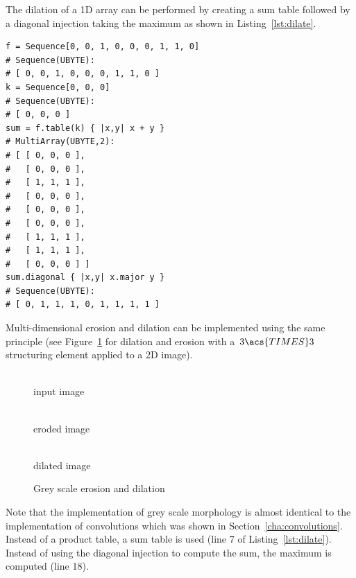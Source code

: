 \documentclass[12pt,a4paper,oneside,openright]{book}
\newcommand{\sct}[1]{Section~\ref{cha:#1}}
\newcommand{\fig}[1]{Figure~\ref{fig:#1}}
\newcommand{\lst}[1]{Listing~\ref{lst:#1}}
\begin{document}
\begin{CJK}{UTF8}{}
The dilation of a \ac{1D} array can be performed by creating a sum table followed by a diagonal injection taking the maximum as shown in \lst{dilate}.
\lstset{language=Ruby,frame=single,numbers=left}
\begin{lstlisting}[float,caption={Implementing dilation using diagonal injection},escapechar=\$,label=lst:dilate]
f = Sequence[0, 0, 1, 0, 0, 0, 1, 1, 0]
# Sequence(UBYTE):
# [ 0, 0, 1, 0, 0, 0, 1, 1, 0 ]
k = Sequence[0, 0, 0]
# Sequence(UBYTE):
# [ 0, 0, 0 ]
sum = f.table(k) { |x,y| x + y }
# MultiArray(UBYTE,2):
# [ [ 0, 0, 0 ],
#   [ 0, 0, 0 ],
#   [ 1, 1, 1 ],
#   [ 0, 0, 0 ],
#   [ 0, 0, 0 ],
#   [ 0, 0, 0 ],
#   [ 1, 1, 1 ],
#   [ 1, 1, 1 ],
#   [ 0, 0, 0 ] ]
sum.diagonal { |x,y| x.major y }
# Sequence(UBYTE):
# [ 0, 1, 1, 1, 0, 1, 1, 1, 1 ]
\end{lstlisting}
Multi-dimensional erosion and dilation can be implemented using the same principle (see \fig{morph} for dilation and erosion with a $3\acs{TIMES} 3$ structuring element applied to a \ac{2D} image).
\begin{figure}[htbp]
  \begin{center}
    \begin{minipage}[t]{.3\textwidth}
      \begin{center}
        \\
        input image
      \end{center}
    \end{minipage}
    \begin{minipage}[t]{.3\textwidth}
      \begin{center}
        \\
        eroded image
      \end{center}
    \end{minipage}
    \begin{minipage}[t]{.3\textwidth}
      \begin{center}
        \\
        dilated image
      \end{center}
    \end{minipage}
    \caption{Grey scale erosion and dilation\label{fig:morph}}
  \end{center}
\end{figure}
Note that the implementation of grey scale morphology is almost identical to the implementation of convolutions which was shown in \sct{convolutions}. Instead of a product table, a sum table is used (line 7 of \lst{dilate}). Instead of using the diagonal injection to compute the sum, the maximum is computed (line 18).


\end{CJK}
\end{document}
